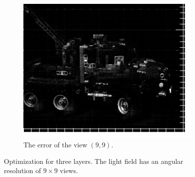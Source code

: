 \documentclass[11pt,a4paper,titlepage]{article}
\begin{document}
\begin{figure}[h]
\begin{subfigure}[t]{0.4\textwidth}
		\includegraphics[width=\textwidth]{results/legotruck_perspective_rec_3Layers_r=0/custom_view_error.png}
		\caption{The error of the view $\left( 9, 9 \right)$.}
	\end{subfigure}

	\caption{Optimization for three layers. The light field has an angular resolution of $9\times 9$ views.}
	\label{fig:legotruck_artefacts_r=0}
\end{figure}
\end{document}
